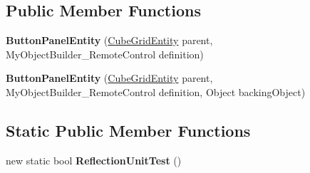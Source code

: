 \subsection*{Public Member Functions}
\begin{DoxyCompactItemize}
\item 
\hypertarget{class_s_e_mod_a_p_i_internal_1_1_a_p_i_1_1_entity_1_1_sector_1_1_sector_object_1_1_cube_grid_1_182a07a9a51cd4f2f7a7f493193da48cf_a1d5cfaed058ed5387a90f192a47c1cb1}{}{\bfseries Button\+Panel\+Entity} (\hyperlink{class_s_e_mod_a_p_i_internal_1_1_a_p_i_1_1_entity_1_1_sector_1_1_sector_object_1_1_cube_grid_entity}{Cube\+Grid\+Entity} parent, My\+Object\+Builder\+\_\+\+Remote\+Control definition)\label{class_s_e_mod_a_p_i_internal_1_1_a_p_i_1_1_entity_1_1_sector_1_1_sector_object_1_1_cube_grid_1_182a07a9a51cd4f2f7a7f493193da48cf_a1d5cfaed058ed5387a90f192a47c1cb1}

\item 
\hypertarget{class_s_e_mod_a_p_i_internal_1_1_a_p_i_1_1_entity_1_1_sector_1_1_sector_object_1_1_cube_grid_1_182a07a9a51cd4f2f7a7f493193da48cf_a3dbe54fedd7bbc9895074d4504b073b3}{}{\bfseries Button\+Panel\+Entity} (\hyperlink{class_s_e_mod_a_p_i_internal_1_1_a_p_i_1_1_entity_1_1_sector_1_1_sector_object_1_1_cube_grid_entity}{Cube\+Grid\+Entity} parent, My\+Object\+Builder\+\_\+\+Remote\+Control definition, Object backing\+Object)\label{class_s_e_mod_a_p_i_internal_1_1_a_p_i_1_1_entity_1_1_sector_1_1_sector_object_1_1_cube_grid_1_182a07a9a51cd4f2f7a7f493193da48cf_a3dbe54fedd7bbc9895074d4504b073b3}

\end{DoxyCompactItemize}
\subsection*{Static Public Member Functions}
\begin{DoxyCompactItemize}
\item 
\hypertarget{class_s_e_mod_a_p_i_internal_1_1_a_p_i_1_1_entity_1_1_sector_1_1_sector_object_1_1_cube_grid_1_182a07a9a51cd4f2f7a7f493193da48cf_a4cf85d00c092766eb7b202c63c259a26}{}new static bool {\bfseries Reflection\+Unit\+Test} ()\label{class_s_e_mod_a_p_i_internal_1_1_a_p_i_1_1_entity_1_1_sector_1_1_sector_object_1_1_cube_grid_1_182a07a9a51cd4f2f7a7f493193da48cf_a4cf85d00c092766eb7b202c63c259a26}

\end{DoxyCompactItemize}
